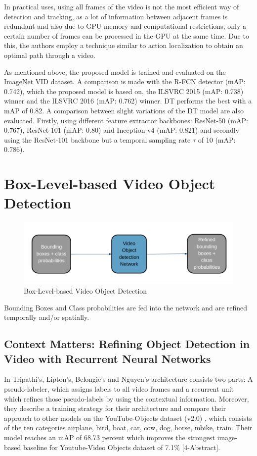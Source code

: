 \documentclass[conference]{IEEEtran}
\begin{document}
In practical uses, using all frames of the video is not the most efficient way of detection and tracking, as a lot of information between adjacent frames is redundant and also due to GPU memory and computational restrictions, only a certain number of frames can be processed in the GPU at the same time. Due to this, the authors employ a technique similar to action localization\cite{b41} to obtain an optimal path through a video. \newline

As mentioned above, the proposed model is trained and evaluated on the ImageNet VID dataset. A comparison is made with the R-FCN detector (mAP: 0.742), which the proposed model is based on, the ILSVRC 2015\cite{b42} (mAP: 0.738) winner and the ILSVRC 2016\cite{b43} (mAP: 0.762) winner. DT performs the best with a mAP of 0.82. A comparison between slight variations of the DT model are also evaluated. Firstly, using different feature extractor backbones: ResNet-50 (mAP: 0.767), ResNet-101 (mAP: 0.80) and Inception-v4 (mAP: 0.821)\cite{b44} and secondly using the ResNet-101 backbone but a temporal sampling rate $\tau$ of 10 (mAP: 0.786).

\section{Box-Level-based Video Object Detection}

\begin{figure}[h]
\includegraphics[width=\columnwidth]{box-level-basic}
\caption{Box-Level-based Video Object Detection}
\end{figure}
Bounding Boxes and Class probabilities are fed into the network and are refined temporally and/or spatially.

\subsection{Context Matters: Refining Object Detection in Video with Recurrent Neural Networks \cite{b4}}
In \cite{b4} Tripathi's, Lipton's, Belongie's and Nguyen's architecture consists two parts: A pseudo-labeler, which assigns labels to all video frames and a recurrent unit which refines those pseudo-labels by using the contextual information. Moreover, they describe a training strategy for their architecture and compare their approach to other models on the YouTube-Objects dataset (v2.0) \cite{b25} , which consists of the ten categories airplane, bird, boat, car, cow, dog, horse, mbike, train. Their model reaches an mAP of 68.73 percent which improves the strongest image-based baseline for Youtube-Video Objects dataset of 7.1\% [4-Abstract]. \newline
\end{document}

